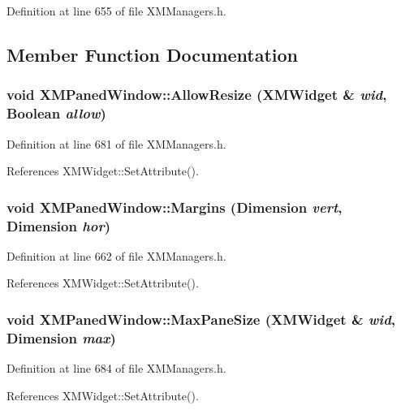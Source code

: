 Definition at line 655 of file XMManagers.h.

\subsection{Member Function Documentation}
\subsubsection{\setlength{\rightskip}{0pt plus 5cm}void XMPaned\-Window::Allow\-Resize ({\bf XMWidget} \& {\em wid}, Boolean {\em allow})\hspace{0.3cm}{\tt  [inline]}}\label{classXMPanedWindow_a9}




Definition at line 681 of file XMManagers.h.

References XMWidget::Set\-Attribute().
\subsubsection{\setlength{\rightskip}{0pt plus 5cm}void XMPaned\-Window::Margins (Dimension {\em vert}, Dimension {\em hor})\hspace{0.3cm}{\tt  [inline]}}\label{classXMPanedWindow_a4}




Definition at line 662 of file XMManagers.h.

References XMWidget::Set\-Attribute().
\subsubsection{\setlength{\rightskip}{0pt plus 5cm}void XMPaned\-Window::Max\-Pane\-Size ({\bf XMWidget} \& {\em wid}, Dimension {\em max})\hspace{0.3cm}{\tt  [inline]}}\label{classXMPanedWindow_a10}




Definition at line 684 of file XMManagers.h.

References XMWidget::Set\-Attribute().
